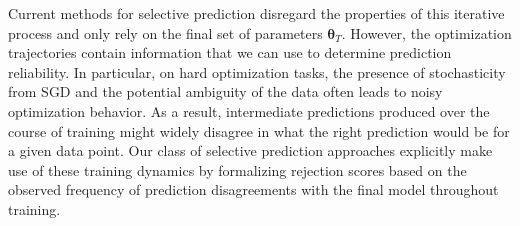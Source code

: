 Current methods for selective prediction disregard the properties of this iterative process and only rely on the final set of parameters $\bm{\theta}_{T}$.  
However, the optimization trajectories 
contain information that we can use to determine prediction reliability. In particular, on hard optimization tasks, the presence of stochasticity from SGD and the potential ambiguity of the data often leads to noisy optimization behavior. As a result, intermediate predictions produced over the course of training might widely disagree in what the right prediction would be for a given data point. %
Our class of selective prediction approaches explicitly make use of these training dynamics by formalizing rejection scores based on the observed frequency of prediction disagreements with the final model throughout training.




